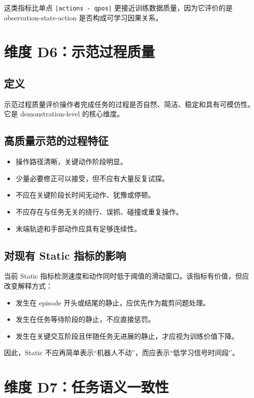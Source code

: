 \documentclass[UTF8,zihao=-4]{ctexart}
\begin{document}
这类指标比单点 \texttt{|actions - qpos|} 更接近训练数据质量，因为它评价的是 observation-state-action 是否构成可学习因果关系。

\section{维度 D6：示范过程质量}

\subsection{定义}

示范过程质量评价操作者完成任务的过程是否自然、简洁、稳定和具有可模仿性。它是 demonstration-level 的核心维度。

\subsection{高质量示范的过程特征}

\begin{itemize}
  \item 操作路径清晰，关键动作阶段明显。
  \item 少量必要修正可以接受，但不应有大量反复试探。
  \item 不应在关键阶段长时间无动作、犹豫或停顿。
  \item 不应存在与任务无关的绕行、误抓、碰撞或重复操作。
  \item 末端轨迹和手部动作应具有足够连续性。
\end{itemize}

\subsection{对现有 Static 指标的影响}

当前 Static 指标检测速度和动作同时低于阈值的滑动窗口。该指标有价值，但应改变解释方式：

\begin{itemize}
  \item 发生在 episode 开头或结尾的静止，应优先作为裁剪问题处理。
  \item 发生在任务等待阶段的静止，不应直接惩罚。
  \item 发生在关键交互阶段且伴随任务无进展的静止，才应视为训练价值下降。
\end{itemize}

因此，Static 不应再简单表示“机器人不动”，而应表示“低学习信号时间段”。

\section{维度 D7：任务语义一致性}
\end{document}
